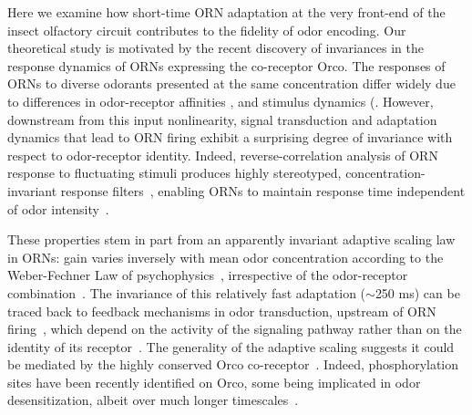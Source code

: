 \documentclass[9pt,twocolumn,twoside]{pnas-new}
\begin{document}
Here we examine how short-time ORN adaptation at the very front-end of the insect olfactory circuit contributes to the fidelity of odor encoding. Our theoretical study is motivated by the recent discovery of invariances in the response dynamics of ORNs expressing the co-receptor Orco. %
The responses of ORNs to diverse odorants presented at the same concentration differ widely due to differences in odor-receptor affinities \cite{hallem_carlson,montague2011similar,geosmin}, and stimulus dynamics (\cite{martelli}. However, downstream from this input nonlinearity, signal transduction and adaptation dynamics that lead to ORN firing exhibit a surprising degree of invariance with respect to odor-receptor identity. Indeed, reverse-correlation analysis of ORN response to fluctuating stimuli produces highly stereotyped, concentration-invariant response filters~\cite{martelli,si2017invariances}, enabling ORNs to maintain response time independent of odor intensity~\cite{martelli, srinivas_elife}.

These properties stem in part from an apparently invariant adaptive scaling law in ORNs: gain varies inversely with mean odor concentration according to the Weber-Fechner Law of psychophysics~\cite{weber1996eh,fechner2012elemente}, irrespective of the odor-receptor combination~\cite{srinivas_elife,cafaro_WL,cao_WL}. The invariance of this relatively fast adaptation ($\sim$250 ms) can be traced back to  feedback mechanisms in odor transduction, upstream of ORN firing~\cite{nagel_wilson_biophysical,cao_WL,cafaro_WL,srinivas_elife}, which depend on the activity of the signaling pathway rather than on the identity of its receptor~\cite{nagel_wilson_biophysical}. 
The generality of the adaptive scaling suggests it could be mediated by the highly conserved Orco co-receptor~\cite{orco_structure,getahun2013insect,getahun2016intracellular,Guo_Smith}. Indeed, phosphorylation sites have been recently identified on Orco, some being implicated in odor desensitization, albeit over much longer timescales~\cite{Guo_Smith_review,Guo_Smith}. 
\end{document}
